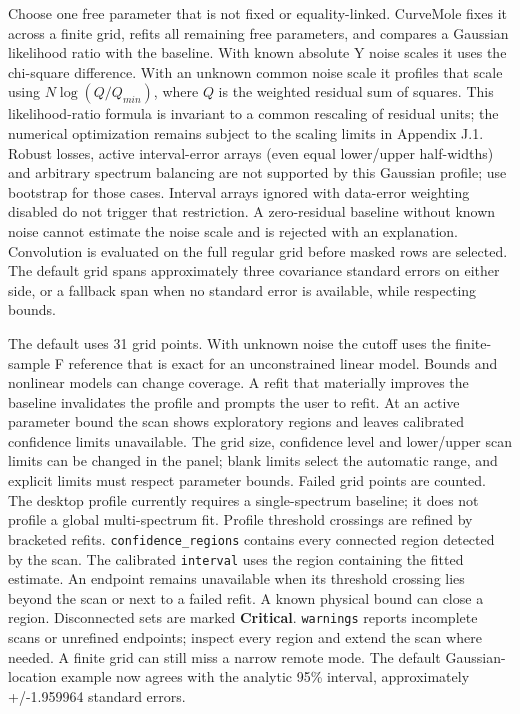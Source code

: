 \documentclass[
  10pt,
  a4paper,
  oneside]{scrreprt}
\begin{document}
Choose one free parameter that is not fixed or equality-linked.
CurveMole fixes it across a finite grid, refits all remaining free
parameters, and compares a Gaussian likelihood ratio with the baseline.
With known absolute Y noise scales it uses the chi-square difference.
With an unknown common noise scale it profiles that scale using
\(N\log(Q/Q_{min})\), where \(Q\) is the weighted residual sum of
squares. This likelihood-ratio formula is invariant to a common
rescaling of residual units; the numerical optimization remains subject
to the scaling limits in Appendix J.1. Robust losses, active
interval-error arrays (even equal lower/upper half-widths) and arbitrary
spectrum balancing are not supported by this Gaussian profile; use
bootstrap for those cases. Interval arrays ignored with data-error
weighting disabled do not trigger that restriction. A zero-residual
baseline without known noise cannot estimate the noise scale and is
rejected with an explanation. Convolution is evaluated on the full
regular grid before masked rows are selected. The default grid spans
approximately three covariance standard errors on either side, or a
fallback span when no standard error is available, while respecting
bounds.

The default uses 31 grid points. With unknown noise the cutoff uses the
finite-sample F reference that is exact for an unconstrained linear
model. Bounds and nonlinear models can change coverage. A refit that
materially improves the baseline invalidates the profile and prompts the
user to refit. At an active parameter bound the scan shows exploratory
regions and leaves calibrated confidence limits unavailable. The grid
size, confidence level and lower/upper scan limits can be changed in the
panel; blank limits select the automatic range, and explicit limits must
respect parameter bounds. Failed grid points are counted. The desktop
profile currently requires a single-spectrum baseline; it does not
profile a global multi-spectrum fit. Profile threshold crossings are
refined by bracketed refits. \texttt{confidence\_regions} contains every
connected region detected by the scan. The calibrated \texttt{interval}
uses the region containing the fitted estimate. An endpoint remains
unavailable when its threshold crossing lies beyond the scan or next to
a failed refit. A known physical bound can close a region. Disconnected
sets are marked \textbf{Critical}. \texttt{warnings} reports incomplete
scans or unrefined endpoints; inspect every region and extend the scan
where needed. A finite grid can still miss a narrow remote mode. The
default Gaussian-location example now agrees with the analytic 95\%
interval, approximately +/-1.959964 standard errors.
\end{document}
